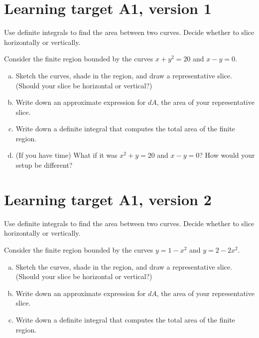 




\everymath{\displaystyle}

\section{Learning target A1, version 1}

Use definite integrals to find the area between two curves. Decide whether to slice horizontally or vertically.

\hrulefill

Consider the finite region bounded by the curves \(x+y^2 = 20\) and \(x - y = 0\). 

\begin{enumerate}[(a)]
	\item Sketch the curves, shade in the region, and draw a representative slice. \\
	(Should your slice be horizontal or vertical?)
	\vfill
	\item Write down an approximate expression for $dA$, the area of your representative slice.
	\vfill
	\item Write down a definite integral that computes the total area of the finite region.
	\vfill
	\item (If you have time) What if it was \(x^2+y = 20\) and \(x-y=0\)? How would your setup be different?
\end{enumerate}

\pagebreak 
\section{Learning target A1, version 2}

Use definite integrals to find the area between two curves. Decide whether to slice horizontally or vertically.

\hrulefill

Consider the finite region bounded by the curves \(y=1-x^2\) and \(y=2-2x^2\). 

\begin{enumerate}[(a)]
	\item Sketch the curves, shade in the region, and draw a representative slice. \\
	(Should your slice be horizontal or vertical?)
	\vfill
	\item Write down an approximate expression for $dA$, the area of your representative slice.
	\vfill
	\item Write down a definite integral that computes the total area of the finite region.
	\vfill
\end{enumerate}

